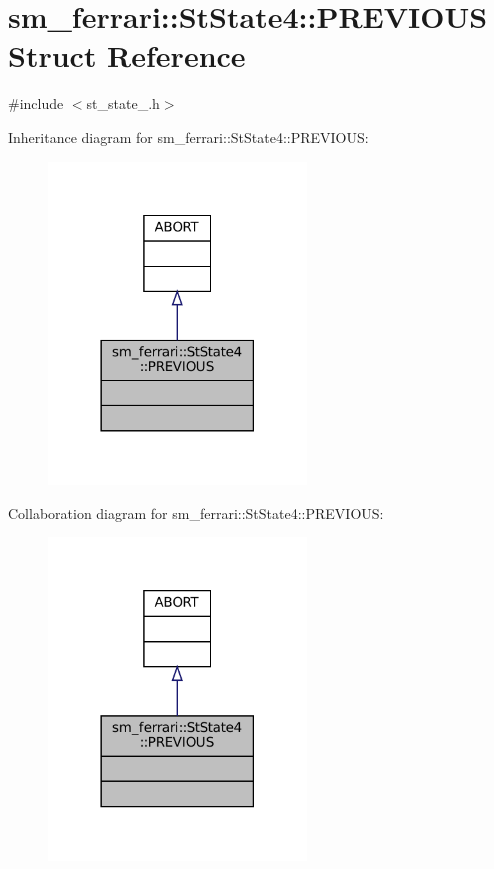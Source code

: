 \hypertarget{structsm__ferrari_1_1StState4_1_1PREVIOUS}{}\section{sm\+\_\+ferrari\+:\+:St\+State4\+:\+:P\+R\+E\+V\+I\+O\+US Struct Reference}
\label{structsm__ferrari_1_1StState4_1_1PREVIOUS}


{\ttfamily \#include $<$st\+\_\+state\+\_.\+h$>$}



Inheritance diagram for sm\+\_\+ferrari\+:\+:St\+State4\+:\+:P\+R\+E\+V\+I\+O\+US\+:
\nopagebreak
\begin{figure}[H]
\begin{center}
\leavevmode
\includegraphics[width=194pt]{structsm__ferrari_1_1StState4_1_1PREVIOUS__inherit__graph}
\end{center}
\end{figure}


Collaboration diagram for sm\+\_\+ferrari\+:\+:St\+State4\+:\+:P\+R\+E\+V\+I\+O\+US\+:
\nopagebreak
\begin{figure}[H]
\begin{center}
\leavevmode
\includegraphics[width=194pt]{structsm__ferrari_1_1StState4_1_1PREVIOUS__coll__graph}
\end{center}
\end{figure}


